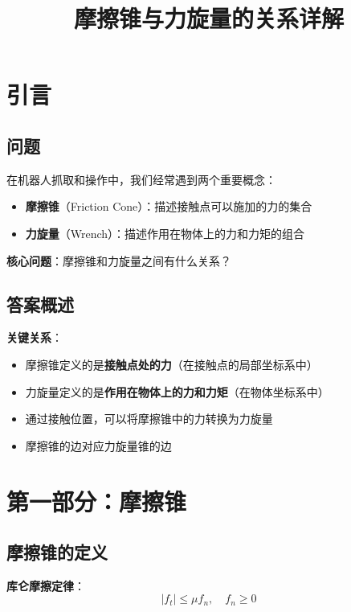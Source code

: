\documentclass[12pt,a4paper]{article}
\title{摩擦锥与力旋量的关系详解}
\author{}
\date{}
\begin{document}
\maketitle

\section{引言}

\subsection{问题}

在机器人抓取和操作中，我们经常遇到两个重要概念：
\begin{itemize}
\item \textbf{摩擦锥}（Friction Cone）：描述接触点可以施加的力的集合
\item \textbf{力旋量}（Wrench）：描述作用在物体上的力和力矩的组合
\end{itemize}

\textbf{核心问题}：摩擦锥和力旋量之间有什么关系？

\subsection{答案概述}

\textbf{关键关系}：
\begin{itemize}
\item 摩擦锥定义的是\textbf{接触点处的力}（在接触点的局部坐标系中）
\item 力旋量定义的是\textbf{作用在物体上的力和力矩}（在物体坐标系中）
\item 通过接触位置，可以将摩擦锥中的力转换为力旋量
\item 摩擦锥的边对应力旋量锥的边
\end{itemize}

\section{第一部分：摩擦锥}

\subsection{摩擦锥的定义}

\textbf{库仑摩擦定律}：
\begin{equation}
|f_t| \leq \mu f_n, \quad f_n \geq 0
\label{eq:coulomb}
\end{equation}
\end{document}
